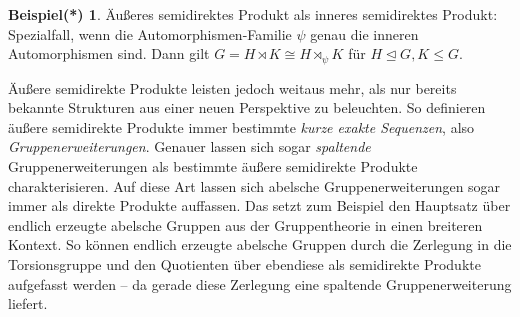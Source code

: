 \documentclass[a4paper, ngerman]{article}
\newcounter{chapter}
\numberwithin{equation}{chapter}
\theoremstyle{plain}
\theoremstyle{definition}
\newtheorem{examplestrd}{Beispiel(*)}[chapter]
\begin{document}
\begin{examplestrd}
    Äußeres semidirektes Produkt als inneres semidirektes Produkt: Spezialfall, wenn die Automorphismen-Familie \(\psi\) genau die inneren Automorphismen sind. Dann gilt \(G = H \rtimes K \cong H \rtimes_\psi K\) für \(H \trianglelefteq G, K \leq G\). 
\end{examplestrd}

Äußere semidirekte Produkte leisten jedoch weitaus mehr, als nur bereits bekannte Strukturen aus einer neuen Perspektive zu beleuchten. So definieren äußere semidirekte Produkte immer bestimmte \textit{kurze exakte Sequenzen}, also \textit{Gruppenerweiterungen}. Genauer lassen sich sogar \textit{spaltende} Gruppenerweiterungen als bestimmte äußere semidirekte Produkte charakterisieren. Auf diese Art lassen sich abelsche Gruppenerweiterungen sogar immer als direkte Produkte auffassen. Das setzt zum Beispiel den Hauptsatz über endlich erzeugte abelsche Gruppen aus der Gruppentheorie in einen breiteren Kontext. So können endlich erzeugte abelsche Gruppen durch die Zerlegung in die Torsionsgruppe und den Quotienten über ebendiese als semidirekte Produkte aufgefasst werden -- da gerade diese Zerlegung eine spaltende Gruppenerweiterung liefert. 

\printbibliography
\end{document}
